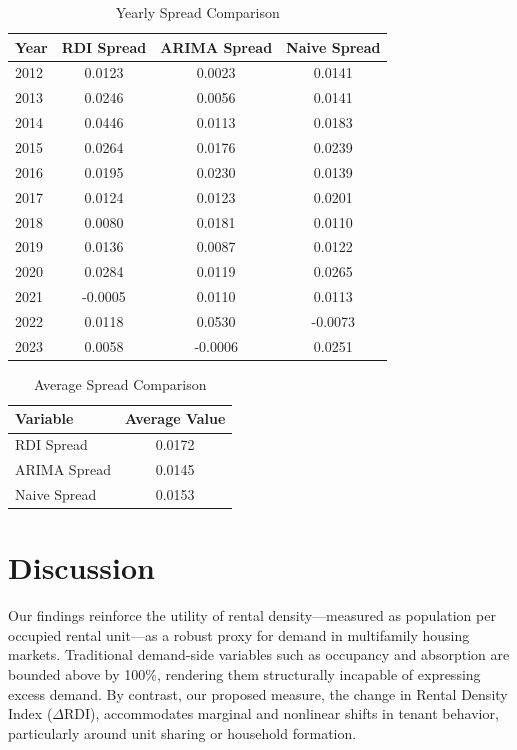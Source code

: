 \documentclass[APA,Times1COL]{WileyNJDv5} %
\begin{document}
\begin{table}[ht]
	\centering
	\caption{Yearly Spread Comparison}
	\label{tab:yearly_spread}
	\begin{tabular}{lccc}
		\toprule
		Year & RDI Spread & ARIMA Spread & Naive Spread \\
		\midrule
		
		2012 & 0.0123     & 0.0023      & 0.0141     \\
		2013 & 0.0246     & 0.0056      & 0.0141     \\
		2014 & 0.0446     & 0.0113      & 0.0183     \\
		2015 & 0.0264     & 0.0176      & 0.0239     \\
		2016 & 0.0195     & 0.0230      & 0.0139     \\
		2017 & 0.0124     & 0.0123      & 0.0201     \\
		2018 & 0.0080     & 0.0181      & 0.0110     \\
		2019 & 0.0136     & 0.0087      & 0.0122     \\
		2020 & 0.0284     & 0.0119      & 0.0265     \\
		2021 & -0.0005    & 0.0110      & 0.0113     \\
		2022 & 0.0118     & 0.0530      & -0.0073    \\
		2023 & 0.0058     & -0.0006     & 0.0251     \\
		
		\bottomrule
	\end{tabular}
\end{table}

\begin{table}[ht]
	\centering
	\caption{Average Spread Comparison}
	\label{tab:average_spread}
	\begin{tabular}{lc}
		\toprule
		Variable & Average Value \\
		\midrule
		
		RDI Spread & 0.0172 \\
		ARIMA Spread & 0.0145 \\
		Naive Spread & 0.0153 \\
		\bottomrule
	\end{tabular}
\end{table}



\section{Discussion}

Our findings reinforce the utility of rental density---measured as population per occupied rental unit---as a robust proxy for demand in multifamily housing markets. Traditional demand-side variables such as occupancy and absorption are bounded above by 100\%, rendering them structurally incapable of expressing excess demand. By contrast, our proposed measure, the change in Rental Density Index (\(\Delta\text{RDI}\)), accommodates marginal and nonlinear shifts in tenant behavior, particularly around unit sharing or household formation.
\end{document}
